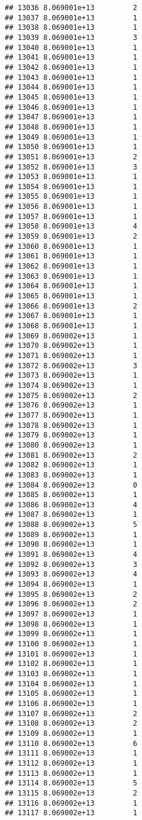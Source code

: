 \documentclass[
]{article}
\begin{document}
\begin{verbatim}
## 13036 8.069001e+13         2
## 13037 8.069001e+13         1
## 13038 8.069001e+13         1
## 13039 8.069001e+13         3
## 13040 8.069001e+13         1
## 13041 8.069001e+13         1
## 13042 8.069001e+13         1
## 13043 8.069001e+13         1
## 13044 8.069001e+13         1
## 13045 8.069001e+13         1
## 13046 8.069001e+13         1
## 13047 8.069001e+13         1
## 13048 8.069001e+13         1
## 13049 8.069001e+13         1
## 13050 8.069001e+13         1
## 13051 8.069001e+13         2
## 13052 8.069001e+13         3
## 13053 8.069001e+13         1
## 13054 8.069001e+13         1
## 13055 8.069001e+13         1
## 13056 8.069001e+13         1
## 13057 8.069001e+13         1
## 13058 8.069001e+13         4
## 13059 8.069001e+13         2
## 13060 8.069001e+13         1
## 13061 8.069001e+13         1
## 13062 8.069001e+13         1
## 13063 8.069001e+13         1
## 13064 8.069001e+13         1
## 13065 8.069001e+13         1
## 13066 8.069001e+13         2
## 13067 8.069001e+13         1
## 13068 8.069001e+13         1
## 13069 8.069002e+13         1
## 13070 8.069002e+13         1
## 13071 8.069002e+13         1
## 13072 8.069002e+13         3
## 13073 8.069002e+13         1
## 13074 8.069002e+13         1
## 13075 8.069002e+13         2
## 13076 8.069002e+13         1
## 13077 8.069002e+13         1
## 13078 8.069002e+13         1
## 13079 8.069002e+13         1
## 13080 8.069002e+13         1
## 13081 8.069002e+13         2
## 13082 8.069002e+13         1
## 13083 8.069002e+13         1
## 13084 8.069002e+13         0
## 13085 8.069002e+13         1
## 13086 8.069002e+13         4
## 13087 8.069002e+13         1
## 13088 8.069002e+13         5
## 13089 8.069002e+13         1
## 13090 8.069002e+13         1
## 13091 8.069002e+13         4
## 13092 8.069002e+13         3
## 13093 8.069002e+13         4
## 13094 8.069002e+13         1
## 13095 8.069002e+13         2
## 13096 8.069002e+13         2
## 13097 8.069002e+13         1
## 13098 8.069002e+13         1
## 13099 8.069002e+13         1
## 13100 8.069002e+13         1
## 13101 8.069002e+13         1
## 13102 8.069002e+13         1
## 13103 8.069002e+13         1
## 13104 8.069002e+13         1
## 13105 8.069002e+13         1
## 13106 8.069002e+13         1
## 13107 8.069002e+13         2
## 13108 8.069002e+13         2
## 13109 8.069002e+13         1
## 13110 8.069002e+13         6
## 13111 8.069002e+13         1
## 13112 8.069002e+13         1
## 13113 8.069002e+13         1
## 13114 8.069002e+13         5
## 13115 8.069002e+13         2
## 13116 8.069002e+13         1
## 13117 8.069002e+13         1

\end{verbatim}
\end{document}
